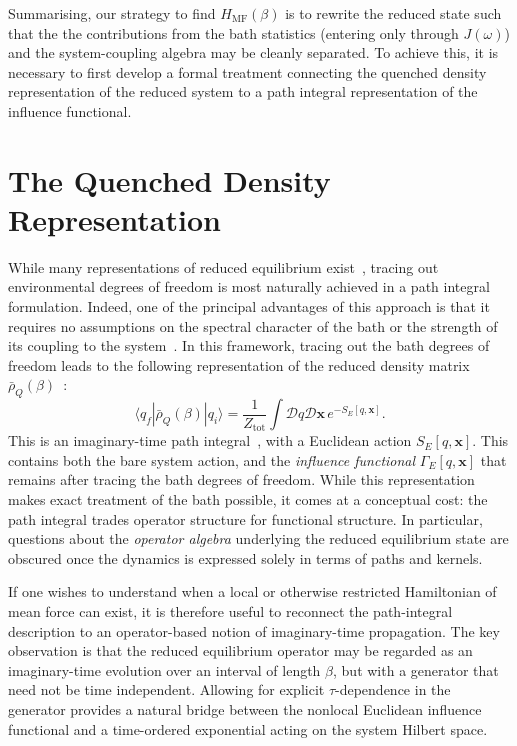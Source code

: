 \documentclass[aps,prl,twocolumn,superscriptaddress,showpacs,floatfix]{revtex4-2}
\begin{document}
Summarising, our strategy to find $H_{\mathrm{MF}}(\beta)$ is to rewrite the reduced state such that the the contributions from the bath statistics (entering only through $J(\omega)$) and the system-coupling algebra may be cleanly separated. To achieve this, it is necessary to first develop a formal treatment connecting the quenched density representation of the reduced system to a path integral representation of the influence functional. 


 \section{\label{sec:quenched}The Quenched Density Representation}



While many representations of reduced equilibrium exist~\cite{weissQuantumDissipativeSystems2012, breuerTheoryOpenQuantum2002, grabertQuantumBrownianMotion1988}, tracing out environmental degrees of freedom is most naturally achieved in a path integral formulation. Indeed, one of the principal advantages of this approach is that it requires no assumptions on the spectral character of the bath or the strength of its coupling to the system~\cite{weissQuantumDissipativeSystems2012}. In this framework, tracing out the bath degrees of freedom leads to the following representation of the reduced density matrix $\bar{\rho}_Q(\beta)$~\cite{feynmanQuantumMechanicsPath1965, kleinertPathIntegralsQuantum2009}:
\begin{equation}
    \langle q_f|\bar{\rho}_Q(\beta)|q_i\rangle = \frac{1}{Z_{\mathrm{tot}}} \int \mathcal{D}q \mathcal{D}\mathbf{x} \, e^{-S_E[q,\mathbf{x}]}.
\end{equation}
This is an imaginary-time path integral~\cite{feynmanQuantumMechanicsPath1965, kleinertPathIntegralsQuantum2009}, with a Euclidean action $S_E[q,\mathbf{x}]$. This contains both the bare system action, and the \emph{influence functional} $\Gamma_E[q,\mathbf{x}]$ that remains after tracing the bath degrees of freedom. While this representation makes exact treatment of the bath possible, it comes at a conceptual cost: the path
integral trades operator structure for functional structure. In particular,
questions about the \emph{operator algebra} underlying the reduced equilibrium
state are obscured once the dynamics is expressed solely in terms of paths and
kernels.

If one wishes to understand when a local or otherwise restricted Hamiltonian of
mean force can exist, it is therefore useful to reconnect the path-integral
description to an operator-based notion of imaginary-time propagation. The key
observation is that the reduced equilibrium operator may be regarded as an
imaginary-time evolution over an interval of length $\beta$, but with a generator
that need not be time independent. Allowing for explicit $\tau$-dependence in
the generator provides a natural bridge between the nonlocal Euclidean influence
functional and a time-ordered exponential acting on the system Hilbert space.
\end{document}
